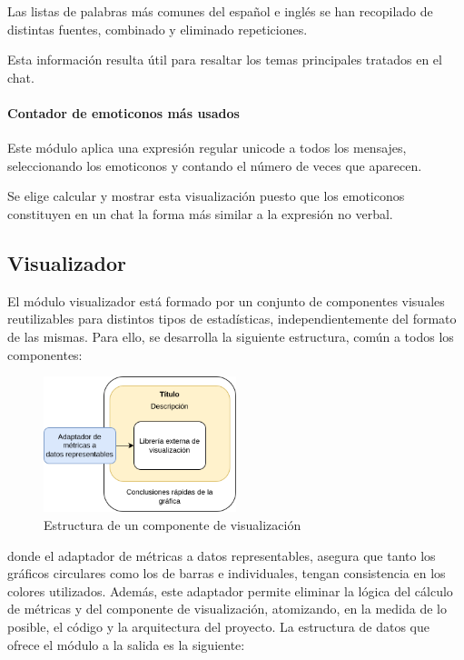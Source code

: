 Las listas de palabras más comunes del español e inglés se han recopilado de distintas fuentes, combinado y eliminado repeticiones.

Esta información resulta útil para resaltar los temas principales tratados en el chat.

\paragraph{Contador de emoticonos más usados}

Este módulo aplica una expresión regular unicode a todos los mensajes, seleccionando los emoticonos y contando el número de veces que aparecen.

Se elige calcular y mostrar esta visualización puesto que los emoticonos constituyen en un chat la forma más similar a la expresión no verbal.

\subsection{Visualizador}

El módulo visualizador está formado por un conjunto de componentes visuales reutilizables para distintos tipos de estadísticas, independientemente del formato de las mismas. Para ello, se desarrolla la siguiente estructura, común a todos los componentes:

\begin{figure}[H]
	\centering
	\includegraphics[width=0.5\textwidth]{img/visualizadores.png}
	\caption{Estructura de un componente de visualización}
	\label{fig:chap4:visualization}
\end{figure}

donde el adaptador de métricas a datos representables, asegura que tanto los gráficos circulares como los de barras e individuales, tengan consistencia en los colores utilizados. Además, este adaptador permite eliminar la lógica del cálculo de métricas y del componente de visualización, atomizando, en la medida de lo posible, el código y la arquitectura del proyecto. La estructura de datos que ofrece el módulo a la salida es la siguiente:

